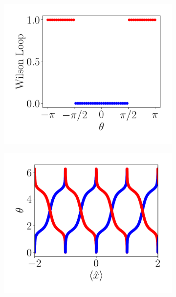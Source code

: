 \begin{figure}[h!]
\begin{subfigure}[b!]{0.27 \textwidth}
     \end{subfigure}\hspace*{-0.9em}
     \begin{subfigure}[b!]{0.27 \textwidth}
         \caption{}
         \includegraphics[width=\textwidth]{Imagenes/Shh_images/winding_shh_pump.pdf}
     \end{subfigure}\hspace*{-0.9em}
     \begin{subfigure}[b!]{0.27 \textwidth}
         \caption{}
         \includegraphics[width=\textwidth]{Imagenes/Shh_images/wannier_center_shh_pump.pdf}

\end{subfigure}
\end{figure}
